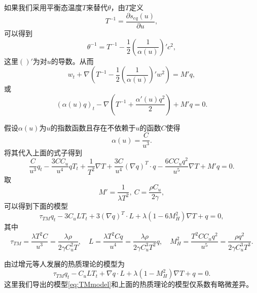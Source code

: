如果我们采用平衡态温度$T$来替代$\theta$，由$T$定义
\begin{equation*}
	T^{-1}=\frac{\partial s_{eq}(u)}{\partial u},
\end{equation*}
可以得到
\begin{equation*}
\theta^{-1}=T^{-1}-\frac{1}{2}(\frac{1}{\alpha(u)})'{c}^2,
\end{equation*}
这里$()'$为对$u$的导数。从而
\begin{equation*}
{w}_t+\nabla(T^{-1}-\frac{1}{2}(\frac{1}{\alpha(u)})' {w}^2)=M'{q},
\end{equation*}
或
\begin{equation*}
({\alpha(u)}{{q}})_t-\nabla(T^{-1} + \frac{\alpha'(u){q}^2}{2})+M' {q}=0.
\end{equation*}

假设$\alpha(u)$为$u$的指数函数且存在不依赖于$u$的函数$C$使得
$$\alpha(u) = \frac{C}{u^3}.$$
将其代入上面的式子得到
$$\frac{C}{u^3} q_t - \frac{3C C_u}{u^4}q T_t + \frac{1}{T^2} \nabla T + \frac{3C}{u^4} (\nabla q)^T \cdot q - \frac{6C C_u q^2}{u^5}  \nabla T + M' q=0.$$
取
\begin{equation*}
M'=\frac{1}{\lambda T^2}, \ C = \frac{\rho C_u}{2 \gamma},
\end{equation*}
可以得到下面的模型
\begin{equation}\label{eq:TMmodel}
\tau_{TM} {q}_t-3C_u {L}T_t+3(\nabla {q})^T \cdot {L}+\lambda(1-6M_H^2)\nabla T+{q}=0,
\end{equation}
其中
\begin{equation*}
\tau_{TM}=\frac{\lambda T^2 C}{u^3}=\frac{\lambda \rho}{2 \gamma C_u^2 T}, \quad {L}=\frac{\lambda T^2 C q}{u^4}=\frac{\lambda \rho}{2 \gamma C_u^3 T^2}{q}, \quad M_H^2=\frac{ T^2C C_u q^2}{u^5}=\frac{ \rho {q}^2}{2\gamma C_u^3 T^3}.
\end{equation*}

由过增元等人发展的热质理论的模型为\cite{dong2011generalized,zeng2006motion,sellitto2013entropy}
\begin{equation*}
\tau_{TM} {q}_t-C_u {L}T_t+\nabla {q} \cdot {L}+\lambda(1-M_H^2)\nabla T+{q}=0.
\end{equation*}
这里我们导出的模型\eqref{eq:TMmodel}和上面的热质理论的模型仅系数有略微差异。


